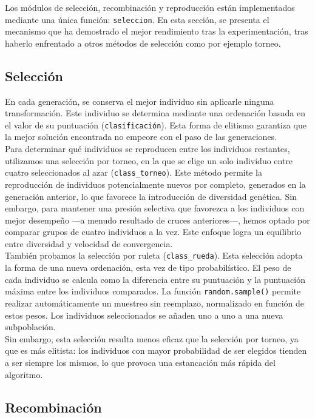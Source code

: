 \documentclass[12pt,a4paper]{report}
\begin{document}
    Los módulos de selección, recombinación y reproducción están implementados mediante una única función: \texttt{seleccion}. En esta sección, se presenta el mecanismo que ha demostrado el mejor rendimiento tras la experimentación, tras haberlo enfrentado a otros métodos de selección como por ejemplo torneo.

    \subsection{Selección}

    En cada generación, se conserva el mejor individuo sin aplicarle ninguna transformación. Este individuo se determina mediante una ordenación basada en el valor de su puntuación (\texttt{clasificación}). Esta forma de elitismo garantiza que la mejor solución encontrada no empeore con el paso de las generaciones.\\

    Para determinar qué individuos se reproducen entre los individuos restantes, utilizamos una selección por torneo, en la que se elige un solo individuo entre cuatro seleccionados al azar (\texttt{class\_torneo}). Este método permite la reproducción de individuos potencialmente nuevos por completo, generados en la generación anterior, lo que favorece la introducción de diversidad genética. Sin embargo, para mantener una presión selectiva que favorezca a los individuos con mejor desempeño —a menudo resultado de cruces anteriores—, hemos optado por comparar grupos de cuatro individuos a la vez.  Este enfoque logra un equilibrio entre diversidad y velocidad de convergencia.\\

    También probamos la selección por ruleta (\texttt{class\_rueda}). Esta selección adopta la forma de una nueva ordenación, esta vez de tipo probabilístico. El peso de cada individuo se calcula como la diferencia entre su puntuación y la puntuación máxima entre los individuos comparados. La función \texttt{random.sample()} permite realizar automáticamente un muestreo sin reemplazo, normalizado en función de estos pesos. Los individuos seleccionados se añaden uno a uno a una nueva subpoblación.\\
    Sin embargo, esta selección resulta menos eficaz que la selección por torneo, ya que es más elitista: los individuos con mayor probabilidad de ser elegidos tienden a ser siempre los mismos, lo que provoca una estancación más rápida del algoritmo.


    \subsection{Recombinación}
\end{document}
